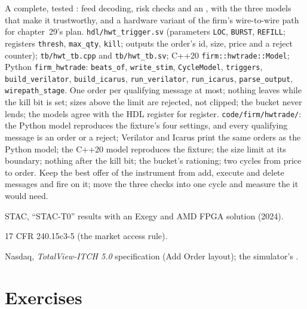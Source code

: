 \begin{build}
 A complete, tested : feed decoding, risk checks and an , with the three models that make
it trustworthy, and a hardware variant of the firm's wire-to-wire path for chapter~29's plan.
 \texttt{hdl/hwt\_trigger.sv} (parameters \texttt{LOC}, \texttt{BURST}, \texttt{REFILL}; registers \texttt{thresh},
\texttt{max\_qty}, \texttt{kill}; outputs the order's id, size, price and a reject counter);  \texttt{tb/hwt\_tb.cpp} and
\texttt{tb/hwt\_tb.sv}; C++20 \texttt{firm::hwtrade::Model}; Python \texttt{firm\_hwtrade}: \texttt{beats\_of}, \texttt{write\_stim},
\texttt{CycleModel}, \texttt{triggers}, \texttt{build\_verilator}, \texttt{build\_icarus}, \texttt{run\_verilator}, \texttt{run\_icarus},
\texttt{parse\_output}, \texttt{wirepath\_stage}.
 One order per qualifying message at most; nothing leaves while the kill bit is set; sizes above the limit are rejected, not
clipped; the bucket never lends; the models agree with the HDL register for register.
 \texttt{code/firm/hwtrade/}: the Python model reproduces the fixture's four settings, and every qualifying
message is an order or a reject; Verilator and Icarus print the same orders as the Python model; the C++20 model reproduces the fixture;
the size limit at its boundary; nothing after the kill bit; the bucket's rationing; two cycles from price to order.
 Keep the best offer of the instrument from add, execute and delete messages and fire on it; move the three checks into one
cycle and measure the  it would need.
\end{build}

\begin{omsources}
\item STAC, ``STAC-T0'' results with an Exegy and AMD FPGA solution (2024).
\item 17 CFR 240.15c3-5 (the market access rule).
\item Nasdaq, \emph{TotalView-ITCH 5.0} specification (Add Order layout); the simulator's .
\end{omsources}

\section{Exercises}

